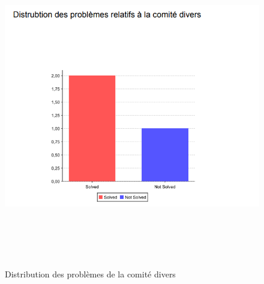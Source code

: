 \documentclass[11.5pt]{report}
\begin{document}
\newpage
\begin{figure}[h]
	
	\begin{center}
		\includegraphics[width=500pt,height=400pt]{d3.png} 
		\caption{Distribution des problèmes de la comité divers}
	\end{center}
	
\end{figure}
\newpage
\end{document}
